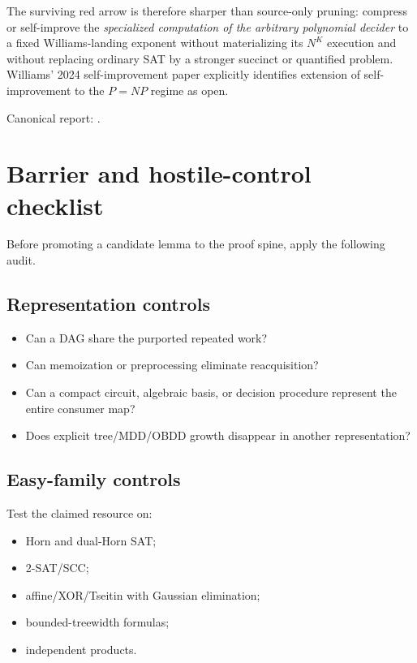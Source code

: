 \documentclass[11pt]{article}
\theoremstyle{plain}
\theoremstyle{definition}
\theoremstyle{remark}
\begin{document}
The surviving red arrow is therefore sharper than source-only pruning:
compress or self-improve the \emph{specialized computation of the arbitrary
polynomial decider} to a fixed Williams-landing exponent without materializing
its \(N^K\) execution and without replacing ordinary SAT by a stronger succinct
or quantified problem.  Williams' 2024 self-improvement paper explicitly
identifies extension of self-improvement to the \(P=NP\) regime as open.

Canonical report:
.


\section{Barrier and hostile-control checklist}

Before promoting a candidate lemma to the proof spine, apply the following
audit.

\subsection{Representation controls}

\begin{itemize}[leftmargin=1.4em]
\item Can a DAG share the purported repeated work?
\item Can memoization or preprocessing eliminate reacquisition?
\item Can a compact circuit, algebraic basis, or decision procedure represent
the entire consumer map?
\item Does explicit tree/MDD/OBDD growth disappear in another representation?
\end{itemize}

\subsection{Easy-family controls}

Test the claimed resource on:

\begin{itemize}[leftmargin=1.4em]
\item Horn and dual-Horn SAT;
\item 2-SAT/SCC;
\item affine/XOR/Tseitin with Gaussian elimination;
\item bounded-treewidth formulas;
\item independent products.
\end{itemize}
\end{document}
